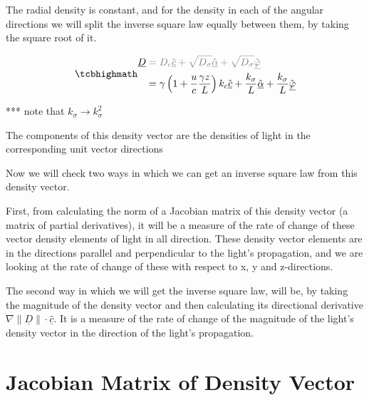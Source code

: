 The radial density is constant, and for the density in each of the angular directions we will split the inverse square law equally between them, by taking the square root of it.


\begin{equation}
	\label{eq: density vector}
	\mhl{
	\begin{aligned}
		\underline{D} & \color{gray} = D_{c} \hat{\underline{c}} + \sqrt{D_{\sigma}}  \hat{\underline{\alpha}} + \sqrt{D_{\sigma}} \hat{\underline{\varphi}} \\
		              & = {\gamma}\left(1 + \dfrac{u}{c}\frac{\gamma z}{L}\right) k_c \hat{\underline{c}} + \frac{k_\sigma}{L} \hat{\underline{\alpha}} + \frac{k_\sigma}{L} \hat{\underline{\varphi}}
	\end{aligned}
	}
\end{equation}

*** note that $k_\sigma \rightarrow k_\sigma^2$

The components of this density vector are the densities of light in the corresponding unit vector directions

Now we will check two ways in which we can get an inverse square law from this density vector.

First, from calculating the norm of a Jacobian matrix of this density vector (a matrix of partial derivatives), it will be a measure of the rate of change of these vector density elements of light in all direction.
These density vector elements are in the directions parallel and perpendicular to the light's propagation, and we are looking at the rate of change of these with respect to x, y and z-directions.

The second way in which we will get the inverse square law, will be, by taking the magnitude of the density vector and then calculating its directional derivative $ \nabla  \| \underline{D} \| \cdot \hat{\underline{c}}$.
It is a measure of the rate of change of the magnitude of the light's density vector in the direction of the light's propagation.

\section{Jacobian Matrix of Density Vector}\label{sect: Jacobian matrix of the Density vec}

